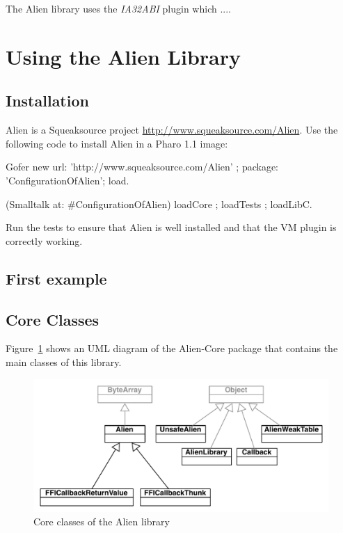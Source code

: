 \documentclass[a4paper,10pt,twoside]{book}
\begin{document}
The Alien library uses the \emph{IA32ABI} plugin which ....



\section{Using the Alien Library} \label{sec:the_alien_library} %

\subsection{Installation} \label{sec:installation} %

Alien is a Squeaksource project \url{http://www.squeaksource.com/Alien}. 
Use the following code to install Alien in a Pharo 1.1 image:

\begin{code}{}
Gofer new
	url: 'http://www.squeaksource.com/Alien' ;
	package: 'ConfigurationOfAlien';
	load.

(Smalltalk at: #ConfigurationOfAlien) loadCore ; 
	loadTests ; 
	loadLibC.
\end{code}

Run the tests to ensure that Alien is well installed and that the VM plugin is correctly working.

\subsection{First example} \label{subsec:first_example} %




\subsection{Core Classes} 

Figure~\ref{fig:alien_uml} shows an UML diagram of the Alien-Core package that contains the main classes of this library.

\begin{figure}[htbp]
	\centering
		\includegraphics[width=0.9\linewidth]{figs/alien_uml}
	\caption{Core classes of the Alien library}
	\label{fig:alien_uml}
\end{figure}
\end{document}
